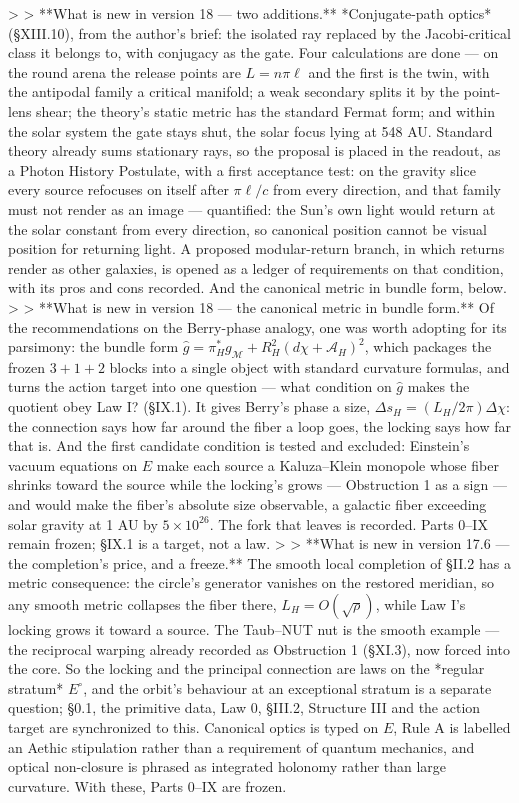 >
> **What is new in version 18 — two additions.** *Conjugate-path optics* (§XIII.10), from the author's brief: the isolated ray replaced by the Jacobi-critical class it belongs to, with conjugacy as the gate. Four calculations are done — on the round arena the release points are $L = n\pi\ell$ and the first is the twin, with the antipodal family a critical manifold; a weak secondary splits it by the point-lens shear; the theory's static metric has the standard Fermat form; and within the solar system the gate stays shut, the solar focus lying at 548 AU. Standard theory already sums stationary rays, so the proposal is placed in the readout, as a Photon History Postulate, with a first acceptance test: on the gravity slice every source refocuses on itself after $\pi\ell/c$ from every direction, and that family must not render as an image — quantified: the Sun's own light would return at the solar constant from every direction, so canonical position cannot be visual position for returning light. A proposed modular-return branch, in which returns render as other galaxies, is opened as a ledger of requirements on that condition, with its pros and cons recorded. And the canonical metric in bundle form, below.
>
> **What is new in version 18 — the canonical metric in bundle form.** Of the recommendations on the Berry-phase analogy, one was worth adopting for its parsimony: the bundle form $\hat g = \pi_H^*g_{\mathcal M}+R_H^2(d\chi+\mathcal A_H)^2$, which packages the frozen $3+1+2$ blocks into a single object with standard curvature formulas, and turns the action target into one question — what condition on $\hat g$ makes the quotient obey Law I? (§IX.1). It gives Berry's phase a size, $\Delta s_H = (L_H/2\pi)\Delta\chi$: the connection says how far around the fiber a loop goes, the locking says how far that is. And the first candidate condition is tested and excluded: Einstein's vacuum equations on $E$ make each source a Kaluza–Klein monopole whose fiber shrinks toward the source while the locking's grows — Obstruction 1 as a sign — and would make the fiber's absolute size observable, a galactic fiber exceeding solar gravity at 1 AU by $5\times10^{26}$. The fork that leaves is recorded. Parts 0–IX remain frozen; §IX.1 is a target, not a law.
>
> **What is new in version 17.6 — the completion's price, and a freeze.** The smooth local completion of §II.2 has a metric consequence: the circle's generator vanishes on the restored meridian, so any smooth metric collapses the fiber there, $L_H = O(\sqrt\rho)$, while Law I's locking grows it toward a source. The Taub–NUT nut is the smooth example — the reciprocal warping already recorded as Obstruction 1 (§XI.3), now forced into the core. So the locking and the principal connection are laws on the *regular stratum* $E^\circ$, and the orbit's behaviour at an exceptional stratum is a separate question; §0.1, the primitive data, Law 0, §III.2, Structure III and the action target are synchronized to this. Canonical optics is typed on $E$, Rule A is labelled an Aethic stipulation rather than a requirement of quantum mechanics, and optical non-closure is phrased as integrated holonomy rather than large curvature. With these, Parts 0–IX are frozen.
